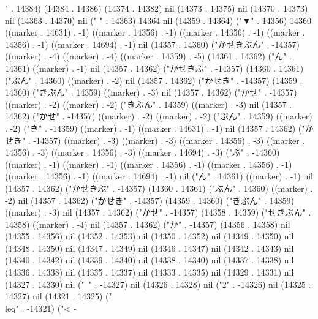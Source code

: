 " . 14384) (14384 . 14386) (14374 . 14382) nil (14373 . 14375) nil (14370 . 14373) nil (14363 . 14370) nil (" " . 14363) 14364 nil (14359 . 14364) ("▼" . 14356) 14360 ((marker . 14631) . -1) ((marker . 14356) . -1) ((marker . 14356) . -1) ((marker . 14356) . -1) ((marker . 14694) . -1) nil (14357 . 14360) ("かせきぶん" . -14357) ((marker) . -4) ((marker) . -4) ((marker . 14359) . -5) (14361 . 14362) ("ん" . 14361) ((marker) . -1) nil (14357 . 14362) ("かせきぶ" . -14357) (14360 . 14361) ("ぶん" . 14360) ((marker) . -2) nil (14357 . 14362) ("かせき" . -14357) (14359 . 14360) ("きぶん" . 14359) ((marker) . -3) nil (14357 . 14362) ("かせ" . -14357) ((marker) . -2) ((marker) . -2) ("きぶん" . 14359) ((marker) . -3) nil (14357 . 14362) ("かせ" . -14357) ((marker) . -2) ((marker) . -2) ("ぶん" . 14359) ((marker) . -2) ("き" . -14359) ((marker) . -1) ((marker . 14631) . -1) nil (14357 . 14362) ("かせき" . -14357) ((marker) . -3) ((marker) . -3) ((marker . 14356) . -3) ((marker . 14356) . -3) ((marker . 14356) . -3) ((marker . 14694) . -3) ("ぶ" . -14360) ((marker) . -1) ((marker) . -1) ((marker . 14356) . -1) ((marker . 14356) . -1) ((marker . 14356) . -1) ((marker . 14694) . -1) nil ("ん" . 14361) ((marker) . -1) nil (14357 . 14362) ("かせきぶ" . -14357) (14360 . 14361) ("ぶん" . 14360) ((marker) . -2) nil (14357 . 14362) ("かせき" . -14357) (14359 . 14360) ("きぶん" . 14359) ((marker) . -3) nil (14357 . 14362) ("かせ" . -14357) (14358 . 14359) ("せきぶん" . 14358) ((marker) . -4) nil (14357 . 14362) ("か" . -14357) (14356 . 14358) nil (14355 . 14356) nil (14352 . 14353) nil (14350 . 14352) nil (14349 . 14350) nil (14348 . 14350) nil (14347 . 14349) nil (14346 . 14347) nil (14342 . 14343) nil (14340 . 14342) nil (14339 . 14340) nil (14338 . 14340) nil (14337 . 14338) nil (14336 . 14338) nil (14335 . 14337) nil (14333 . 14335) nil (14329 . 14331) nil (14327 . 14330) nil ("~" . -14327) nil (14326 . 14328) nil ("2" . -14326) nil (14325 . 14327) nil (14321 . 14325) ("\\leq" . -14321) ("<
-
